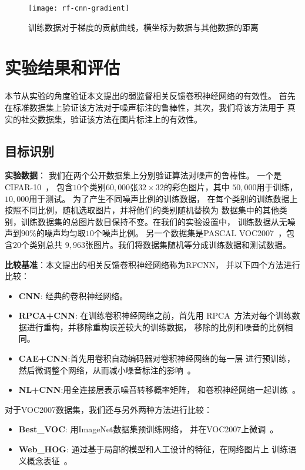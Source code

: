 \begin{figure}[ht]
    \center
    \texttt{[image: rf-cnn-gradient]}
    \caption{训练数据对于梯度的贡献曲线，横坐标为数据与其他数据的距离}\label{fig:rf-cnn-gradient}
\end{figure}

\section{实验结果和评估}
本节从实验的角度验证本文提出的弱监督相关反馈卷积神经网络的有效性。
首先在标准数据集上验证该方法对于噪声标注的鲁棒性，其次，我们将该方法用于
真实的社交数据集，验证该方法在图片标注上的有效性。

\subsection{目标识别}

\textbf{实验数据}： 我们在两个公开数据集上分别验证算法对噪声的鲁棒性。
一个是CIFAR-10~\cite{krizhevsky2009learning}，
包含$10$个类别$60,000$张$32\times 32$的彩色图片，其中
$50,000$用于训练，$10,000$用于测试。 为了产生不同噪声比例的训练数据，
在每个类别的训练数据上按照不同比例，随机选取图片，并将他们的类别随机替换为
数据集中的其他类别，训练数据集的总图片数目保持不变。在我们的实验设置中，
训练数据从无噪声到$90\%$的噪声均匀取$10$个噪声比例。
另一个数据集是PASCAL VOC2007~\cite{pascal-voc-2007}，包含$20$个类别总共
$9,963$张图片。我们将数据集随机等分成训练数据和测试数据。

\textbf{比较基准}：本文提出的相关反馈卷积神经网络称为RFCNN，
并以下四个方法进行比较：
\begin{itemize}
    \item \textbf{CNN}: 经典的卷积神经网络。
    \item \textbf{RPCA+CNN}: 在训练卷积神经网络之前，首先用
        RPCA~\cite{candes2011robust}方法对每个训练数据进行重构，并移除重构误差较大的训练数据，
        移除的比例和噪音的比例相同。
    \item \textbf{CAE+CNN}:首先用卷积自动编码器对卷积神经网络的每一层
        进行预训练，然后微调整个网络，从而减小噪音标注的影响~\cite{luo2012hierarchical}。
    \item \textbf{NL+CNN}:用全连接层表示噪音转移概率矩阵，
        和卷积神经网络一起训练~\cite{sukhbaatar2014training}。
\end{itemize}

对于VOC2007数据集，我们还与另外两种方法进行比较：
\begin{itemize}
    \item \textbf{Best\_VOC}: 用ImageNet数据集预训练网络，
        并在VOC2007上微调~\cite{oquab2014learning}。
    \item \textbf{Web\_HOG}: 通过基于局部的模型和人工设计的特征，在网络图片上
        训练语义概念表征~\cite{divvala2014learning}。
\end{itemize}

